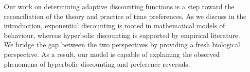 \documentclass[titlepage, hidelinks, 12pt]{article}
\theoremstyle{plain}
\theoremstyle{remark}
\theoremstyle{definition}
\begin{document}
Our work on determining adaptive discounting functions is a step toward the reconciliation of the theory and practice of time preferences. As
we discuss in the introduction, exponential discounting is rooted in mathematical models of behaviour, whereas hyperbolic discounting is supported
by empirical literature. We bridge the gap between the two perspectives by providing a fresh biological perspective. 
As a result, our model is capable of explaining the observed phenomena of hyperbolic discounting and preference
reversals. 





\newpage

{}
\end{document}
